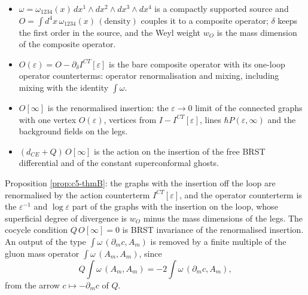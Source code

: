\begin{remark}
\begin{itemize}
\item $\omega=\omega_{1234}(x)\,dx^1\wedge dx^2\wedge dx^3\wedge dx^4$ is a compactly supported source and $O=\int d^4x\,\omega_{1234}(x)\,(\text{density})$ couples it to a composite operator; $\delta$ keeps the first order in the source, and the Weyl weight $w_O$ is the mass dimension of the composite operator.
\item $O(\varepsilon)=O-\partial_\delta I^{CT}[\varepsilon]$ is the bare composite operator with its one-loop operator counterterms: operator renormalisation and mixing, including mixing with the identity $\int\omega$.
\item $O[\infty]$ is the renormalised insertion: the $\varepsilon\to0$ limit of the connected graphs with one vertex $O(\varepsilon)$, vertices from $I-I^{CT}[\varepsilon]$, lines $\hbar P(\varepsilon,\infty)$ and the background fields on the legs.
\item $(d_{CE}+Q)\,O[\infty]$ is the action on the insertion of the free BRST differential and of the constant superconformal ghosts.
\end{itemize}
\end{remark}

\begin{remark}
Proposition \ref{prop:c5-thmB}: the graphs with the insertion off the loop are renormalised by the action counterterm $I^{CT}[\varepsilon]$, and the operator counterterm is the $\varepsilon^{-1}$ and $\log\varepsilon$ part of the graphs with the insertion on the loop, whose superficial degree of divergence is $w_O$ minus the mass dimensions of the legs. The cocycle condition $Q\,O[\infty]=0$ is BRST invariance of the renormalised insertion. An output of the type $\int\omega\,(\partial_mc,A_m)$ is removed by a finite multiple of the gluon mass operator $\int\omega\,(A_m,A_m)$, since
\[
Q\int\omega\,(A_m,A_m)=-2\int\omega\,(\partial_mc,A_m),
\]
from the arrow $c\mapsto-\partial_mc$ of $Q$.
\end{remark}

